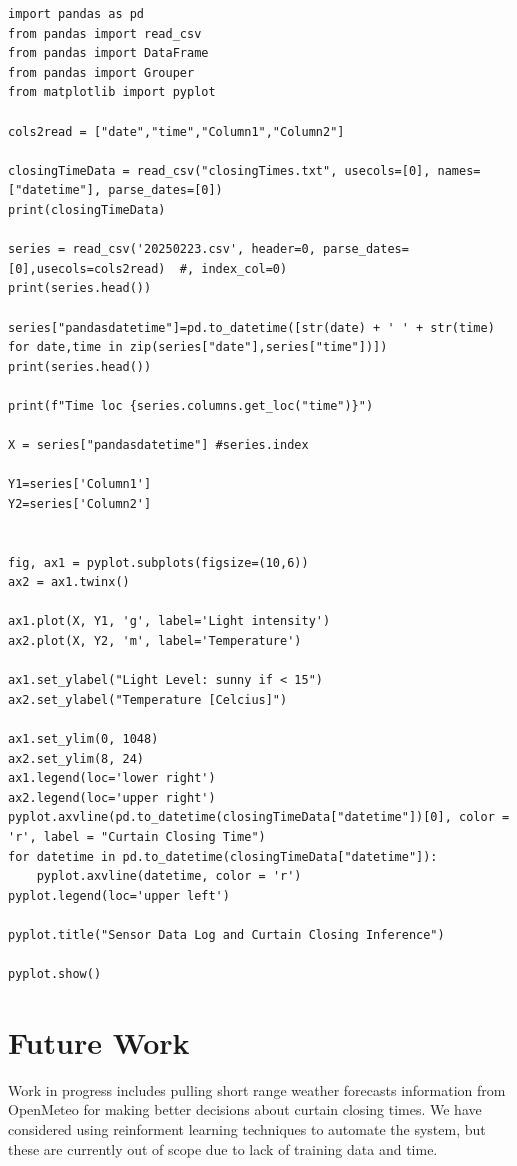 \documentclass[a4paper,12pt]{article}
\begin{document}
\begin{lstlisting}
import pandas as pd
from pandas import read_csv
from pandas import DataFrame
from pandas import Grouper
from matplotlib import pyplot

cols2read = ["date","time","Column1","Column2"]

closingTimeData = read_csv("closingTimes.txt", usecols=[0], names=["datetime"], parse_dates=[0])
print(closingTimeData)

series = read_csv('20250223.csv', header=0, parse_dates=[0],usecols=cols2read)  #, index_col=0)
print(series.head())

series["pandasdatetime"]=pd.to_datetime([str(date) + ' ' + str(time) for date,time in zip(series["date"],series["time"])])
print(series.head())

print(f"Time loc {series.columns.get_loc("time")}")

X = series["pandasdatetime"] #series.index

Y1=series['Column1']
Y2=series['Column2']


fig, ax1 = pyplot.subplots(figsize=(10,6))
ax2 = ax1.twinx()

ax1.plot(X, Y1, 'g', label='Light intensity')
ax2.plot(X, Y2, 'm', label='Temperature')

ax1.set_ylabel("Light Level: sunny if < 15")
ax2.set_ylabel("Temperature [Celcius]")

ax1.set_ylim(0, 1048)
ax2.set_ylim(8, 24)
ax1.legend(loc='lower right')
ax2.legend(loc='upper right')
pyplot.axvline(pd.to_datetime(closingTimeData["datetime"])[0], color = 'r', label = "Curtain Closing Time")
for datetime in pd.to_datetime(closingTimeData["datetime"]):
    pyplot.axvline(datetime, color = 'r')
pyplot.legend(loc='upper left')

pyplot.title("Sensor Data Log and Curtain Closing Inference")

pyplot.show()

\end{lstlisting}


\section{Future Work}

Work in progress includes pulling short range weather forecasts information from OpenMeteo\cite{url:openmeteo} for making better decisions 
about curtain closing times.
We have considered using reinforment learning techniques to automate the system, but these are currently out of scope due to lack of training 
data and time.
\end{document}
